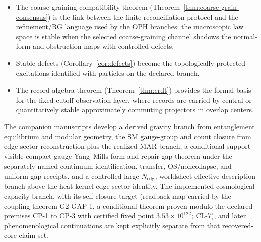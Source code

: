 \documentclass[11pt]{article}
\theoremstyle{remark}
\theoremstyle{plain}
\begin{document}
\begin{itemize}
receipt. The compact paper separately proves projective weak-* / GNS extraction from its finite
cylinder system. On a finite support quotient, weighted resampling inside observation fibers is the
orthogonal conditional-expectation projector. A concrete active repair kernel has that status only
when its independently extracted transition matrix satisfies the support, equal-fiber-row, and
weighted detailed-balance receipt of Ref.~\cite{observableNormalForms}; constructing the tested
matrix from the target projector formula is not a verification. Identification with Euclidean
transfer, vacuum persistence, OS reconstruction, noncollapse, and passage of the uniform repair
gap require their separately named finite and continuum receipts. On that certified branch the
Yang--Mills gap equals the repair gap; coherent
cylinder extraction alone does not make that identification or supply a Clay-admissible theory.
\item The coarse-graining compatibility theorem (Theorem~\ref{thm:coarse-grain-consensus}) is the link between the finite reconciliation protocol and the refinement/RG language used by the OPH branches: the macroscopic law space is stable when the selected coarse-graining channel shadows the normal-form and obstruction maps with controlled defects.
\item Stable defects (Corollary~\ref{cor:defects}) become the topologically protected excitations identified with particles on the declared branch.
\item The record-algebra theorem (Theorem~\ref{thm:crdt}) provides the formal basis for the fixed-cutoff observation layer, where records are carried by central or quantitatively stable approximately commuting projectors in overlap centers.
\end{itemize}

The companion manuscripts develop a derived gravity branch from entanglement equilibrium and modular geometry, the SM gauge-group and count closure from edge-sector reconstruction plus the realized MAR branch, a conditional support-visible compact-gauge Yang--Mills form and repair-gap theorem under the separately named continuum-identification, transfer, OS/noncollapse, and uniform-gap receipts, and a controlled large-\(N_{\mathrm{edge}}\) worldsheet effective-description branch above the heat-kernel edge-sector identity. The implemented cosmological capacity branch, with its self-closure target (readback map carried by the coupling theorem G2-GAP-1, a conditional theorem proven modulo the declared premises CP-1 to CP-3 with certified fixed point \(3.53\times10^{122}\); CL-7), and later phenomenological continuations are kept explicitly separate from that recovered-core claim set.
\end{document}
